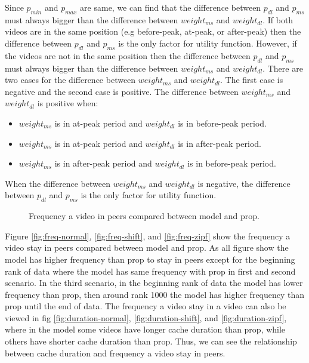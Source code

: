 \documentclass[10pt,final,journal,a4paper]{IEEEtran}
\begin{document}
Since $p_{min}$ and $p_{max}$ are same, we can find that the difference between $p_{dl}$ and $p_{ms}$ must always bigger than the difference between $weight_{ms}$ and $weight_{dl}$.
If both videos are in the same position (e.g before-peak, at-peak, or after-peak) then the difference between $p_{dl}$ and $p_{ms}$ is the only factor for utility function.
However, if the videos are not in the same position then the difference between $p_{dl}$ and $p_{ms}$ must always bigger than the difference between $weight_{ms}$ and $weight_{dl}$.
There are two cases for the difference between $weight_{ms}$ and $weight_{dl}$.
The first case is negative and the second case is positive.    
The difference between $weight_{ms}$ and $weight_{dl}$ is positive when: 
\begin{itemize}
\item $weight_{ms}$ is in at-peak period and $weight_{dl}$ is in before-peak period.
\item $weight_{ms}$ is in at-peak period and $weight_{dl}$ is in after-peak period.
\item $weight_{ms}$ is in after-peak period and $weight_{dl}$ is in before-peak period.
\end{itemize}
When the difference between $weight_{ms}$ and $weight_{dl}$ is negative, the difference between $p_{dl}$ and $p_{ms}$ is the only factor for utility function.

\begin{figure}[!t]
\centering
{}
\hfill
{}
\hfill
{}
\vspace{2mm}
\caption{Frequency a video in peers compared between model and prop.}
\label{fig:freq}
\end{figure}

Figure \ref{fig:freq-normal}, \ref{fig:freq-shift}, and \ref{fig:freq-zipf} show the frequency a video stay in peers compared between model and prop.
As all figure show the model has higher frequency than prop to stay in peers except for the beginning rank of data where the model has same frequency with prop in first and second scenario. 
In the third scenario, in the beginning rank of data the model has lower frequency than prop, then around rank 1000 the model has higher frequency than prop until the end of data. 
The frequency a video stay in a video can also be viewed in fig \ref{fig:duration-normal},  \ref{fig:duration-shift}, and \ref{fig:duration-zipf}, where in the model some videos have longer cache duration than prop, while others have shorter cache duration than prop.  
Thus, we can see the relationship between cache duration and frequency a video stay in peers. 
\end{document}
